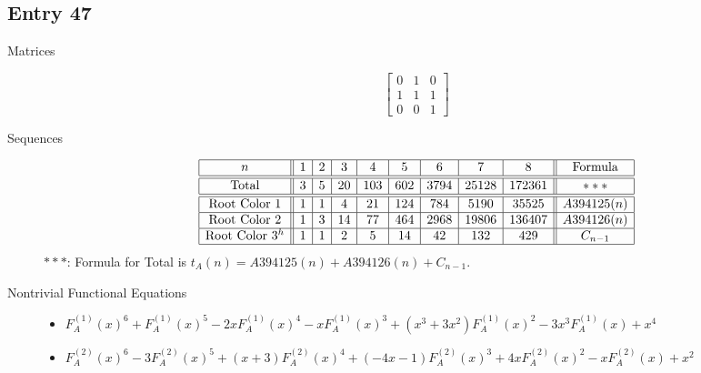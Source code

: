 \documentclass[12pt]{amsart}
\newcommand{\gff}[2]{F_{#2}^{(#1)}(x)}
\newcommand{\gfa}[1]{\gff{#1}{A}}
\begin{document}
\subsection*{Entry 47}
\begin{description}
    \item[Matrices]
    
    \[\begin{bmatrix}
0 & 1 & 0 \\
1 & 1 & 1 \\
0 & 0 & 1
\end{bmatrix}\]
    \item[Sequences]\hspace*{\fill}\vspace{-0.5cm}
    \begin{center}
        \[
        \begin{array}{|c||c|c|c|c|c|c|c|c||c|}\hline
           n  & 1 & 2 & 3 & 4 & 5 & 6 & 7 & 8  & \text{Formula}\\\hline\hline
           \text{Total}  & 3 & 5 & 20 & 103 & 602 & 3794 & 25128 & 172361 & ***\\\hline\hline
           \text{Root Color }1 & 1 & 1 & 4 & 21 & 124 & 784 & 5190 & 35525 & A394125(n)\\\hline
           \text{Root Color }2 & 1 & 3 & 14 & 77 & 464 & 2968 & 19806 & 136407 & A394126(n)\\\hline
           \text{Root Color }3^{h} & 1 & 1 & 2 & 5 & 14 & 42 & 132 & 429 & C_{n-1}\\\hline
        \end{array}
        \]
        $***$: Formula for Total is $t_A(n)=A394125(n)+A394126(n)+C_{n-1}$.
    \end{center}
    
    \item[Nontrivial Functional Equations]\hspace*{\fill}

    \begin{itemize}
\item $\gfa{1}^6+\gfa{1}^5-2x\gfa{1}^4-x\gfa{1}^3+(x^3 + 3x^2)\gfa{1}^2-3x^3\gfa{1}+x^4$


\item $\gfa{2}^6-3\gfa{2}^5+(x + 3)\gfa{2}^4+(-4x - 1)\gfa{2}^3+4x\gfa{2}^2-x\gfa{2}+x^2$


\end{itemize}
    
\end{description}
\end{document}
